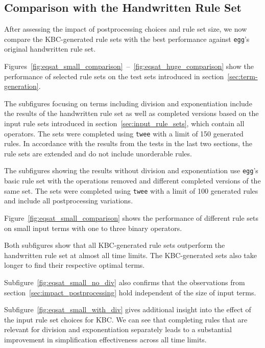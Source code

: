 \FloatBarrier
\subsection{Comparison with the Handwritten Rule Set}
\label{sec:results_by_rule_set}

After assessing the impact of postprocessing choices and rule set size, we now compare the KBC-generated rule sets with the best performance against \texttt{egg}'s original handwritten rule set. 

Figures~\ref{fig:eqsat_small_comparison}~--~\ref{fig:eqsat_huge_comparison} show the performance of selected rule sets on the test sets introduced in section~\ref{sec:term-generation}. 

The subfigures focusing on terms including division and exponentiation include the results of the handwritten rule set as well as completed versions based on the input rule sets introduced in section~\ref{sec:input_rule_sets}, which contain all operators. The sets were completed using \texttt{twee} with a limit of 150 generated rules. In accordance with the results from the tests in the last two sections, the rule sets are extended and do not include unorderable rules.

The subfigures showing the results without division and exponentiation use \texttt{egg}'s basic rule set with the operations removed and different completed versions of the same set. The sets were completed using \texttt{twee} with a limit of 100 generated rules and include all postprocessing variations.

Figure~\ref{fig:eqsat_small_comparison} shows the performance of different rule sets on small input terms with one to three binary operators.

Both subfigures show that all KBC-generated rule sets outperform the handwritten rule set at almost all time limits. The KBC-generated sets also take longer to find their respective optimal terms.

Subfigure~\ref{fig:eqsat_small_no_div} also confirms that the observations from section~\ref{sec:impact_postprocessing} hold independent of the size of input terms.

Subfigure~\ref{fig:eqsat_small_with_div} gives additional insight into the effect of the input rule set choices for KBC. We can see that completing rules that are relevant for division and exponentiation separately leads to a substantial improvement in simplification effectiveness across all time limits. 

